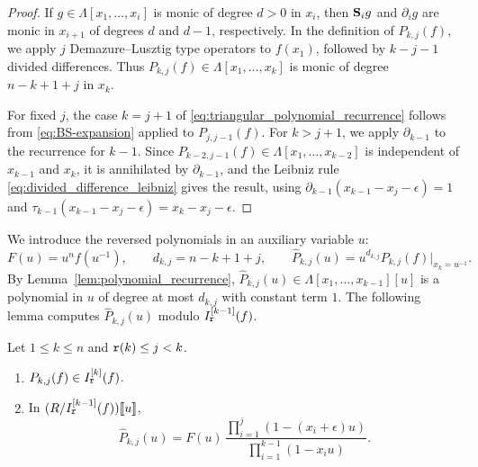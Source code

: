 \begin{proof}
If $g\in\Lambda[x_1,\dots,x_i]$ is monic of degree $d>0$ in $x_i$,
then $\mathbf S_i g$ and $\partial_i g$ are monic in $x_{i+1}$ of degrees $d$ and $d-1$,
respectively.
In the definition of $P_{k,j}(f)$, we apply $j$ Demazure--Lusztig type operators to $f(x_1)$,
followed by $k-j-1$ divided differences.
Thus $P_{k,j}(f)\in\Lambda[x_1,\dots,x_k]$ is monic of degree $n-k+1+j$ in $x_k$.

For fixed $j$, the case $k=j+1$ of
\eqref{eq:triangular_polynomial_recurrence} follows from
\eqref{eq:BS-expansion} applied to $P_{j,j-1}(f)$.
For $k>j+1$, we apply $\partial_{k-1}$ to the recurrence for $k-1$.
Since $P_{k-2,j-1}(f)\in\Lambda[x_1,\dots,x_{k-2}]$ is independent of $x_{k-1}$ and $x_k$,
it is annihilated by $\partial_{k-1}$, and the Leibniz rule
\eqref{eq:divided_difference_leibniz} gives the result, using
$\partial_{k-1}(x_{k-1}-x_j-\epsilon)=1$ and
$\tau_{k-1}(x_{k-1}-x_j-\epsilon)=x_k-x_j-\epsilon$.
\end{proof}

We introduce the reversed polynomials in an auxiliary variable $u$:
\[
  F(u)=u^nf(u^{-1}),\qquad
  d_{k,j}=n-k+1+j,\qquad
  \widehat P_{k,j}(u)
    =u^{d_{k,j}}P_{k,j}(f)\big|_{x_k=u^{-1}}.
\]
By Lemma~\ref{lem:polynomial_recurrence}, $\widehat P_{k,j}(u)\in \Lambda[x_1,\dots,x_{k-1}][u]$
is a polynomial in $u$ of degree at most $d_{k,j}$ with constant term $1$.
The following lemma computes $\widehat P_{k,j}(u)$ modulo $I_{\mathtt r}^{[k-1]}(f)$.

\begin{lemma}\label{lem:operator_chern_relation}
Let $1\leq k\leq n$ and $\mathtt r(k)\leq j<k$.
\begin{enumerate}
  \item\label{item:Pk}
    $P_{k,j}(f)\in I_{\mathtt r}^{[k]}(f)$.
  \item\label{item:Qk}
    In $(R/I_{\mathtt r}^{[k-1]}(f))\llbracket u\rrbracket$,
    \begin{equation}\label{eq:operator_chern_series}
      \widehat P_{k,j}(u)
      =
      F(u)\,
      \frac{\prod_{i=1}^{j}(1-(x_i+\epsilon)u)}
           {\prod_{i=1}^{k-1}(1-x_i u)}.
    \end{equation}
\end{enumerate}
\end{lemma}

